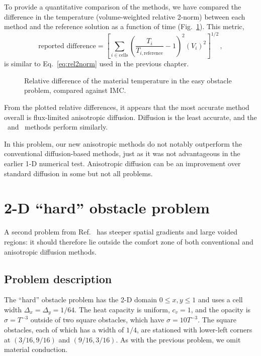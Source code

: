\thesisclearpage

To provide a quantitative comparison of the
methods, we have compared the difference in the temperature (volume-weighted
relative 2-norm) between each method and the reference solution as a function of
time (Fig.~\ref{fig:easymkConvergence}).
This metric,
\begin{equation*}
  \text{reported difference} =
  \left[ \sum_{i \in \text{cells}} \left(
  \frac{T_i}{T_{i,\text{reference}}} - 1 \right)^2 (V_i)^2\right]^{1/2} \,,
\end{equation*}
is similar to Eq.~\eqref{eq:rel2norm} used in the previous chapter.

\begin{figure}[htb]
  \centering
  
  \caption{Relative difference of the material temperature in the easy obstacle
  problem, compared against IMC.}
  \label{fig:easymkConvergence}
\end{figure}

From the plotted relative differences, it appears that the most accurate method
overall is flux-limited anisotropic diffusion. Diffusion is the least accurate,
and the \APone\ and \Pone\ methods perform similarly.

In this problem, our new anisotropic methods do not notably outperform the
conventional diffusion-based methods, just as it was not advantageous in the
earlier 1-D numerical test. Anisotropic diffusion can be an
improvement over standard diffusion in some but not all problems.

\nonthesisclearpage
\section{2-D \texorpdfstring{``hard''}{hard} obstacle problem}

A second problem from Ref.~\cite{Mou2006} has steeper spatial gradients and
large voided regions: it should therefore lie outside the comfort zone of
both conventional and anisotropic diffusion methods.

\subsection{Problem description}

The ``hard'' obstacle problem has the 2-D domain $0 \le x,y \le 1$ and uses a
cell width $\Delta_x=\Delta_y=1/64$. The heat capacity is uniform, $c_v=1$, and
the opacity is $\sigma=T^{-3}$ outside of two square obstacles, which have
$\sigma=10 T^{-3}$. The square obstacles, each of which has a width of $1/4$, are
stationed with lower-left corners at $(3/16, 9/16)$ and $(9/16,3/16)$. As with
the previous problem, we omit material conduction.


